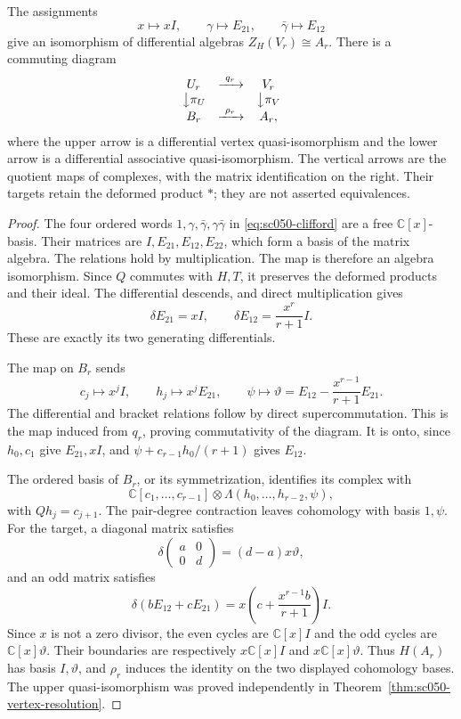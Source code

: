\begin{theorem}\label{thm:sc050-zhu-matrix}
The assignments
\[
 x\longmapsto xI,\qquad
 \gamma\longmapsto E_{21},\qquad
 \bar\gamma\longmapsto E_{12}
\]
give an isomorphism of differential algebras \(Z_H(V_r)\cong A_r\).
There is a commuting diagram
\begin{equation}\label{eq:sc050-square}
 \begin{array}{ccc}
 U_r&\xrightarrow{\ q_r\ }&V_r\\
 \big\downarrow\pi_U&&\big\downarrow\pi_V\\
 B_r&\xrightarrow{\ \rho_r\ }&A_r ,
 \end{array}
\end{equation}
where the upper arrow is a differential vertex quasi-isomorphism
and the lower arrow is a differential associative quasi-isomorphism.
The vertical arrows are the quotient maps of complexes, with
the matrix identification on the right. Their targets retain
the deformed product \(*\); they are not asserted equivalences.
\end{theorem}
\begin{proof}
The four ordered words \(1,\gamma,\bar\gamma,\gamma\bar\gamma\)
in \eqref{eq:sc050-clifford} are a free \(\mathbb C[x]\)-basis.
Their matrices are \(I,E_{21},E_{12},E_{22}\), which form a basis
of the matrix algebra. The relations hold by multiplication.
The map is therefore an algebra isomorphism. Since \(Q\) commutes
with \(H,T\), it preserves the deformed products and their ideal.
The differential descends, and direct multiplication gives
\[
 \delta E_{21}=xI,\qquad
 \delta E_{12}=\frac{x^r}{r+1}I.
\]
These are exactly its two generating differentials.

The map on \(B_r\) sends
\[
 c_j\longmapsto x^jI,\qquad
 h_j\longmapsto x^jE_{21},\qquad
 \psi\longmapsto
 \vartheta=E_{12}-\frac{x^{r-1}}{r+1}E_{21}.
\]
The differential and bracket relations follow by direct
supercommutation. This is the map induced from \(q_r\), proving
commutativity of the diagram. It is onto, since \(h_0,c_1\) give
\(E_{21},xI\), and
\(\psi+c_{r-1}h_0/(r+1)\) gives \(E_{12}\).

The ordered basis of \(B_r\), or its symmetrization, identifies
its complex with
\[
 \mathbb C[c_1,\ldots,c_{r-1}]
 \otimes\Lambda(h_0,\ldots,h_{r-2},\psi),
\]
with \(Qh_j=c_{j+1}\). The pair-degree contraction leaves
cohomology with basis \(1,\psi\).
For the target, a diagonal matrix satisfies
\[
 \delta\begin{pmatrix}a&0\\0&d\end{pmatrix}
      =(d-a)x\vartheta,
\]
and an odd matrix satisfies
\[
 \delta(bE_{12}+cE_{21})
      =x\left(c+\frac{x^{r-1}b}{r+1}\right)I.
\]
Since \(x\) is not a zero divisor, the even cycles are
\(\mathbb C[x]I\) and the odd cycles are
\(\mathbb C[x]\vartheta\).
Their boundaries are respectively \(x\mathbb C[x]I\) and
\(x\mathbb C[x]\vartheta\).
Thus \(H(A_r)\) has basis \(I,\vartheta\), and \(\rho_r\)
induces the identity on the two displayed cohomology bases.
The upper quasi-isomorphism was proved independently in
Theorem~\ref{thm:sc050-vertex-resolution}.
\end{proof}

